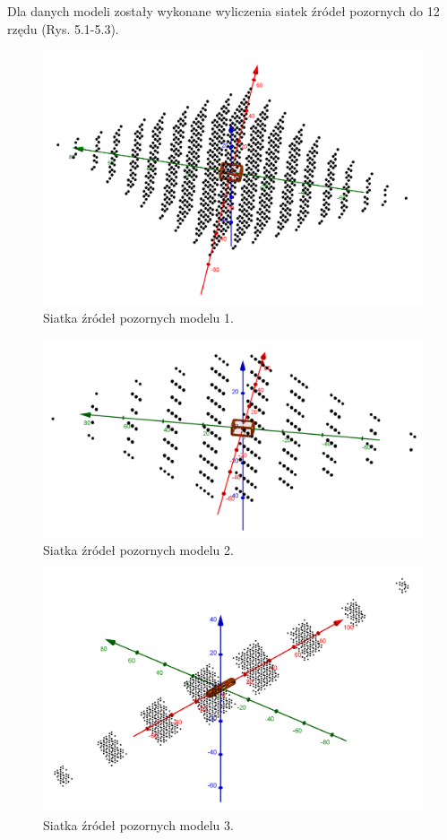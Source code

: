 Dla danych modeli zostały wykonane wyliczenia siatek źródeł pozornych do 12 rzędu (Rys. 5.1-5.3).

\begin{figure}[h]
        \centering
                \centering
                \includegraphics[width=12cm]{siatka1}
	\caption{Siatka źródeł pozornych modelu 1.}
\end{figure}

\begin{figure}[h]
        \centering
                \centering
                \includegraphics[width=12cm]{siatka2}
	\caption{Siatka źródeł pozornych modelu 2.}
\end{figure}

\begin{figure}[h]
        \centering
                \centering
                \includegraphics[width=12cm]{siatka3}
	\caption{Siatka źródeł pozornych modelu 3.}
\end{figure}

